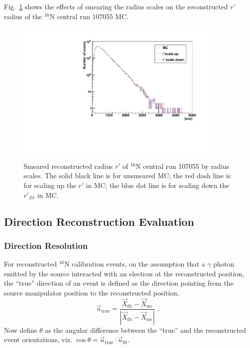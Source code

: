 Fig.~\ref{fig:RscaleSmear} shows the effects of smearing the radius scales on the reconstructed $r'$ radius of the $^{16}$N central run 107055 MC. 

\begin{figure}
	\centering
	\includegraphics[width=10cm]{smearRadResol.pdf}
	\caption[Smeared reconstructed radius $r'$ spectrum of $^{16}$N central run 107055 MC by radius scales.]{Smeared reconstructed radius $r'$ of $^{16}$N central run 107055 by radius scales. The solid black line is for unsmeared MC; the red dash line is for scaling up the $r'$ in MC; the blue dot line is for scaling down the $r'_{fit}$ in MC.\label{fig:RscaleSmear}}
\end{figure} 


\subsection{Direction Reconstruction Evaluation}

\subsubsection{Direction Resolution}

For reconstructed $^{16}$N calibration events, on the assumption that a $\gamma$ photon emitted by the source interacted with an electron at the reconstructed position, the ``true'' direction of an event is defined as the direction pointing from the source manipulator position to the reconstructed position,
\begin{equation}
\vec{u}_{\mathrm{true}} = \frac{\vec{X}_{\mathrm{fit}}-\vec{X}_{\mathrm{src}}}{|\vec{X}_{\mathrm{fit}}-\vec{X}_\mathrm{src}|} \; .
\end{equation}
Now define $\theta$ as the angular difference between the ``true'' and the reconstructed event orientations, viz. $\cos\theta= \vec{u}_{\mathrm{true}} \cdot \vec{u}_{\mathrm{fit}}$.

